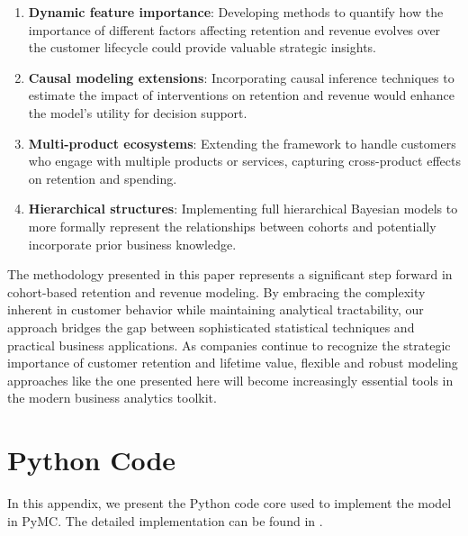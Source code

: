 \documentclass[11pt]{amsart}
\theoremstyle{definition}
\begin{document}
\begin{enumerate}
    \item \textbf{Dynamic feature importance}: Developing methods to quantify how the importance of different factors
          affecting retention and revenue evolves over the customer lifecycle could provide valuable strategic insights.

    \item \textbf{Causal modeling extensions}: Incorporating causal inference techniques to estimate the impact of
          interventions on retention and revenue would enhance the model's utility for decision support.

    \item \textbf{Multi-product ecosystems}: Extending the framework to handle customers who engage with multiple products or
          services, capturing cross-product effects on retention and spending.

    \item \textbf{Hierarchical structures}: Implementing full hierarchical Bayesian models to more formally represent the
          relationships between cohorts and potentially incorporate prior business knowledge.
\end{enumerate}

The methodology presented in this paper represents a significant step forward in cohort-based retention and revenue modeling.
By embracing the complexity inherent in customer behavior while maintaining analytical tractability, our approach bridges the
gap between sophisticated statistical techniques and practical business applications. As companies continue to recognize the
strategic importance of customer retention and lifetime value, flexible and robust modeling approaches like the one presented
here will become increasingly essential tools in the modern business analytics toolkit.

\appendix

\section{Python Code}\label{sec:appendix}

In this appendix, we present the Python code core used to implement the model in PyMC.
The detailed implementation can be found in \cite{orduz_revenue_retention}.
\end{document}
